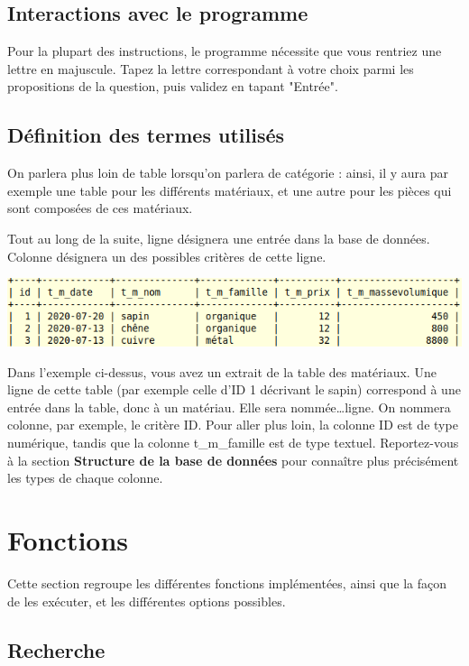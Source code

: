 \documentclass[12pt,a4paper]{article}
\begin{document}
\bigskip
\subsection{Interactions avec le programme}
    Pour la plupart des instructions, le programme nécessite que vous rentriez une lettre en majuscule.
    Tapez la lettre correspondant à votre choix parmi les propositions de la question,
    puis validez en tapant "Entrée".


\bigskip    
\subsection{Définition des termes utilisés}
    On parlera plus loin de table lorsqu'on parlera de catégorie : ainsi, il y aura par exemple
    une table pour les différents matériaux, et une autre pour les pièces qui sont composées de ces matériaux.

    Tout au long de la suite, ligne désignera une entrée dans la base de données.
    Colonne désignera un des possibles critères de cette ligne.
    
    \includegraphics{exemple_lignes_colonnes.png}

    Dans l'exemple ci-dessus, vous avez un extrait de la table des matériaux.
    Une ligne de cette table (par exemple celle d'ID 1 décrivant le sapin) correspond à une entrée
    dans la table, donc à un matériau. Elle sera nommée\dots ligne.
    On nommera colonne, par exemple, le critère ID. Pour aller plus loin, la colonne ID
    est de type numérique, tandis que la colonne t\_m\_famille est de type textuel.
    Reportez-vous à la section \textbf{Structure de la base de données} pour connaître plus précisément
    les types de chaque colonne.



\clearpage
\section{Fonctions}

Cette section regroupe les différentes fonctions implémentées, ainsi que la façon de les exécuter, et les différentes options possibles.

\bigskip
\subsection{Recherche}
\end{document}
